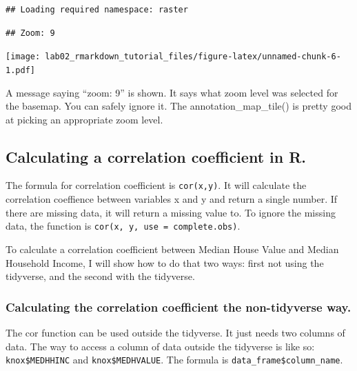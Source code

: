 \documentclass[]{article}
\newenvironment{Shaded}{\begin{snugshade}}{\end{snugshade}}
\newcommand{\CommentTok}[1]{\textcolor[rgb]{0.56,0.35,0.01}{\textit{#1}}}
\newcommand{\DataTypeTok}[1]{\textcolor[rgb]{0.13,0.29,0.53}{#1}}
\newcommand{\KeywordTok}[1]{\textcolor[rgb]{0.13,0.29,0.53}{\textbf{#1}}}
\newcommand{\NormalTok}[1]{#1}
\newcommand{\OperatorTok}[1]{\textcolor[rgb]{0.81,0.36,0.00}{\textbf{#1}}}
\newcommand{\StringTok}[1]{\textcolor[rgb]{0.31,0.60,0.02}{#1}}
\begin{document}
\begin{verbatim}
## Loading required namespace: raster
\end{verbatim}

\begin{verbatim}
## Zoom: 9
\end{verbatim}

\texttt{[image: lab02\_rmarkdown\_tutorial\_files/figure-latex/unnamed-chunk-6-1.pdf]}

A message saying ``zoom: 9'' is shown. It says what zoom level was
selected for the basemap. You can safely ignore it. The
annotation\_map\_tile() is pretty good at picking an appropriate zoom
level.

\hypertarget{calculating-a-correlation-coefficient-in-r.}{%
\subsection{Calculating a correlation coefficient in
R.}\label{calculating-a-correlation-coefficient-in-r.}}

The formula for correlation coefficient is \texttt{cor(x,y)}. It will
calculate the correlation coeffience between variables x and y and
return a single number. If there are missing data, it will return a
missing value to. To ignore the missing data, the function is
\texttt{cor(x,\ y,\ use\ =\ \textquotesingle{}complete.obs\textquotesingle{})}.

To calculate a correlation coefficient between Median House Value and
Median Household Income, I will show how to do that two ways: first not
using the tidyverse, and the second with the tidyverse.

\hypertarget{calculating-the-correlation-coefficient-the-non-tidyverse-way.}{%
\subsubsection{Calculating the correlation coefficient the non-tidyverse
way.}\label{calculating-the-correlation-coefficient-the-non-tidyverse-way.}}

The cor function can be used outside the tidyverse. It just needs two
columns of data. The way to access a column of data outside the
tidyverse is like so: \texttt{knox\$MEDHHINC} and
\texttt{knox\$MEDHVALUE}. The formula is
\texttt{data\_frame\$column\_name}.

\begin{Shaded}
\end{Shaded}
\end{document}
